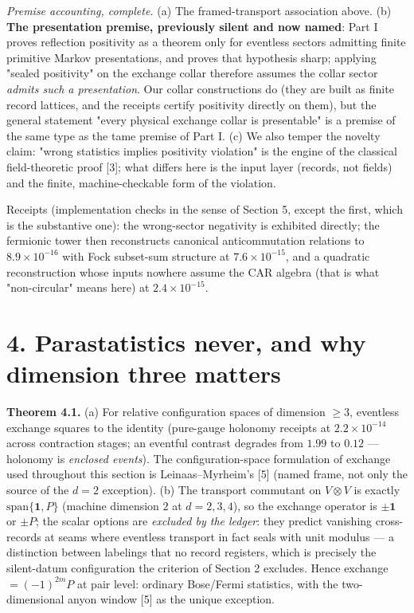 \documentclass[11pt]{article}
\begin{document}
\emph{Premise accounting, complete.}  (a) The framed-transport association above.  (b) \textbf{The presentation premise, previously silent and now named}: Part I proves reflection positivity as a theorem only for eventless sectors admitting finite primitive Markov presentations, and proves that hypothesis sharp; applying "sealed positivity" on the exchange collar therefore assumes the collar sector \emph{admits such a presentation}.  Our collar constructions do (they are built as finite record lattices, and the receipts certify positivity directly on them), but the general statement "every physical exchange collar is presentable" is a premise of the same type as the tame premise of Part I.  (c) We also temper the novelty claim: "wrong statistics implies positivity violation" is the engine of the classical field-theoretic proof [3]; what differs here is the input layer (records, not fields) and the finite, machine-checkable form of the violation.

Receipts (implementation checks in the sense of Section 5, except the first, which is the substantive one): the wrong-sector negativity is exhibited directly; the fermionic tower then reconstructs canonical anticommutation relations to $8.9\times 10^{-16}$ with Fock subset-sum structure at $7.6\times 10^{-15}$, and a quadratic reconstruction whose inputs nowhere assume the CAR algebra (that is what "non-circular" means here) at $2.4\times 10^{-15}$.

\section*{4. Parastatistics never, and why dimension three matters}
\textbf{Theorem 4.1.}  (a) For relative configuration spaces of dimension $\ge 3$, eventless exchange squares to the identity (pure-gauge holonomy receipts at $2.2\times 10^{-14}$ across contraction stages; an eventful contrast degrades from $1.99$ to $0.12$ — holonomy is \emph{enclosed events}).  The configuration-space formulation of exchange used throughout this section is Leinaas–Myrheim's [5] (named frame, not only the source of the $d = 2$ exception).  (b) The transport commutant on $V \otimes V$ is exactly $\mathrm{span}\{\mathbf 1, P\}$ (machine dimension $2$ at $d = 2, 3, 4$), so the exchange operator is $\pm\mathbf 1$ or $\pm P$; the scalar options are \emph{excluded by the ledger}: they predict vanishing cross-records at seams where eventless transport in fact seals with unit modulus — a distinction between labelings that no record registers, which is precisely the silent-datum configuration the criterion of Section 2 excludes.  Hence exchange $= (-1)^{2m}P$ at pair level: ordinary Bose/Fermi statistics, with the two-dimensional anyon window [5] as the unique exception.
\end{document}
